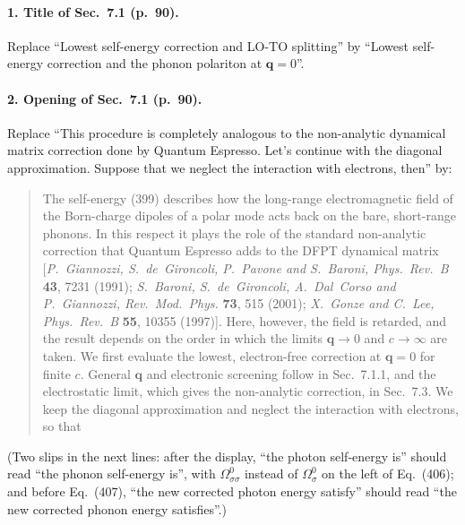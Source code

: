 \paragraph{1. Title of Sec.~7.1 (p.~90).}
Replace ``Lowest self-energy correction and LO-TO splitting'' by
``Lowest self-energy correction and the phonon polariton at $\mathbf q=0$''.

\paragraph{2. Opening of Sec.~7.1 (p.~90).}
Replace ``This procedure is completely analogous to the non-analytic dynamical matrix correction
done by Quantum Espresso. Let's continue with the diagonal approximation. Suppose that we neglect
the interaction with electrons, then'' by:
\begin{quote}
The self-energy (399) describes how the long-range electromagnetic field of the Born-charge
dipoles of a polar mode acts back on the bare, short-range phonons. In this respect it plays the
role of the standard non-analytic correction that Quantum Espresso adds to the DFPT dynamical
matrix [\textit{P.~Giannozzi, S.~de~Gironcoli, P.~Pavone and S.~Baroni, Phys.\ Rev.\ B}
\textbf{43}, 7231 (1991); \textit{S.~Baroni, S.~de~Gironcoli, A.~Dal~Corso and P.~Giannozzi,
Rev.\ Mod.\ Phys.} \textbf{73}, 515 (2001); \textit{X.~Gonze and C.~Lee, Phys.\ Rev.\ B}
\textbf{55}, 10355 (1997)]. Here, however, the field is retarded, and the result depends on the
order in which the limits $\mathbf q\to0$ and $c\to\infty$ are taken. We first evaluate the
lowest, electron-free correction at $\mathbf q=0$ for finite $c$. General $\mathbf q$ and
electronic screening follow in Sec.~7.1.1, and the electrostatic limit, which gives the
non-analytic correction, in Sec.~7.3. We keep the diagonal approximation and neglect the
interaction with electrons, so that
\end{quote}
(Two slips in the next lines: after the display, ``the photon self-energy is'' should read ``the
phonon self-energy is'', with $\Omega^0_{\sigma\sigma}$ instead of $\Omega^0_\sigma$ on the left of
Eq.~(406); and before Eq.~(407), ``the new corrected photon energy satisfy'' should read ``the new
corrected phonon energy satisfies''.)

